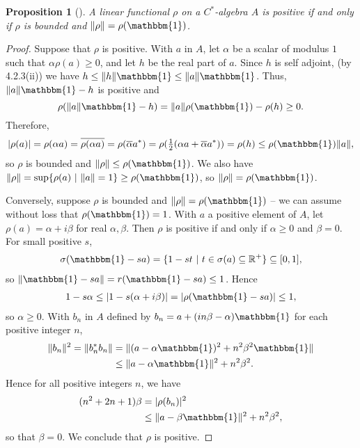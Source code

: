 \documentclass[12pt,a4paper]{report}
\theoremstyle{plain}
\newtheorem{prop}{Proposition}
\theoremstyle{definition}
\newcommand{\1}{\mathbbm{1}}
\newcommand{\R}{\mathbb{R}}
\newcommand{\spec}[1]{\sigma(#1)}
\begin{document}
\begin{prop}[{\cite[4.3.2]{kadison83}}]
	A linear functional $\rho$ on a $C^\ast$-algebra $A$ is positive if and only if $\rho$ is bounded
	and $\|\rho\| = \rho(\1)$.
\end{prop}
\begin{proof} %
	Suppose that $\rho$ is positive. With $a$ in $A$, let $\alpha$ be a scalar of modulus $1$ 
	such that $\alpha\rho(a)\geq 0$, and let $h$ be the real part of $a$.
	Since $h$ is self adjoint, (by 4.2.3(ii)) we have $h \leq \|h\|\1 \leq \|a\|\1$. Thus, $\|a\|\1-h$
	is positive and 
	\[
		\rho(\|a\|\1-h) = \|a\|\rho(\1)-\rho(h) \geq 0.
	\]
	Therefore,
	\begin{align*}
		|\rho(a)| = \rho(\alpha a) = \overline{\rho(\alpha a)} = \rho(\overline{\alpha}a^\ast) = 
					\rho(\tfrac{1}{2}(\alpha a +\overline{\alpha}a^\ast)) =
					\rho(h) \leq \rho(\1) \|a\|,
	\end{align*}
	so $\rho$ is bounded and $\|\rho\| \leq \rho(\1)$. We also have $\|\rho\| = \sup\{\rho(a)~|~\|a\|=
	1\} \geq \rho(\1)$, so $\|\rho\|=\rho(\1)$.
	
	Conversely, suppose $\rho$ is bounded and $\|\rho\| = \rho(\1)$ -- we can assume without loss that 
	$\rho(\1)=1$. With $a$ a positive element of $A$, let $\rho(a)=\alpha+i\beta$ for real $\alpha
	,\beta$. Then $\rho$ is positive if and only if $\alpha \geq 0$ and $\beta =0$.
	For small positive $s$, 
	\begin{align*}
		\spec{\1-sa} = \{1-st ~|~ t\in \spec{a} \subseteq \R^+\} \subseteq [0,1],
	\end{align*}
	so $\|\1-sa\| = r(\1-sa) \leq 1$. Hence
	\begin{align*}
		1-s\alpha \leq |1-s(\alpha+i\beta)| = |\rho(\1 - sa)| \leq 1,
	\end{align*}
	so $\alpha\geq0$. With $b_n$ in $A$ defined by $b_n= a+(in\beta-\alpha)\1$ for each positive
	integer $n$,
	\begin{align*}
				\|b_n\|^2 = \|b_n^\ast b_n\| 
		&= 		\|(a-\alpha\1)^2 + n^2\beta^2\1\| 									\\
		&\leq 	\|a-\alpha\1\|^2 +n^2\beta^2.
	\end{align*}
	Hence for all positive integers $n$, we have
	\begin{align*}
				(n^2+2n+1)\beta 
		&=	 	|\rho(b_n)|^2  														\\
		&\leq 	\|a-\beta\1\|^2 +n^2\beta^2,
	\end{align*}
	so that $\beta=0$. We conclude that $\rho$ is positive.
\end{proof}
\end{document}
